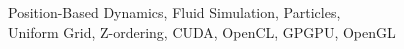 Position-Based Dynamics, Fluid Simulation, Particles, \\ Uniform Grid, Z-ordering, CUDA, OpenCL, GPGPU, OpenGL  
